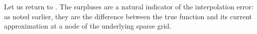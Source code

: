 Let us return to . The surpluses are a natural indicator of
the interpolation error: as noted earlier, they are the difference between the
true function and its current approximation at a node of the underlying sparse
grid.

